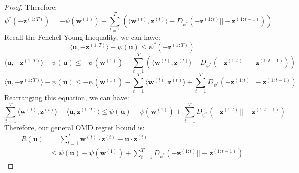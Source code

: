 \documentclass[11pt]{article}
\begin{document}
\begin{proof}
Therefore:
\begin{equation*}
    \psi^*(-\bm{z}^{(1:T)}) = -\psi(\bm{w}^{(1)}) - \sum_{t=1}^T \left( \langle \bm{w}^{(t)}, \bm{z}^{(t)} \rangle -  D_{\psi^*}(-\bm{z}^{(1:t)}||-\bm{z}^{(1:t-1)})\right)
\end{equation*}
Recall the Fenchel-Young Inequality, we can have:
\begin{equation*}
     \langle \bm{u}, -\bm{z}^{(1:T)} \rangle - \psi(\bm{u}) \leq \psi^*(-\bm{z}^{(1:T)})
\end{equation*}
\begin{equation*}
     \langle \bm{u}, -\bm{z}^{(1:T)} \rangle - \psi(\bm{u}) \leq -\psi(\bm{w}^{(1)}) - \sum_{t=1}^T \left( \langle \bm{w}^{(t)}, \bm{z}^{(t)} \rangle -  D_{\psi^*}(-\bm{z}^{(1:t)}||-\bm{z}^{(1:t-1)})\right)
\end{equation*}
\begin{equation*}
     \langle \bm{u}, -\bm{z}^{(1:T)} \rangle - \psi(\bm{u}) \leq -\psi(\bm{w}^{(1)}) - \sum_{t=1}^T  \langle \bm{w}^{(t)}, \bm{z}^{(t)} \rangle + \sum_{t=1}^T D_{\psi^*}(-\bm{z}^{(1:t)}||-\bm{z}^{(1:t-1)})
\end{equation*}
Rearranging this equation, we can have:
\begin{equation*}
     \sum_{t=1}^T  \langle \bm{w}^{(t)}, \bm{z}^{(t)} \rangle - \langle \bm{u}, \bm{z}^{(1:T)} \rangle  \leq \psi(\bm{u}) -\psi(\bm{w}^{(1)}) + \sum_{t=1}^T D_{\psi^*}(-\bm{z}^{(1:t)}||-\bm{z}^{(1:t-1)})
\end{equation*}
Therefore, our general OMD regret bound is:
\begin{equation*}
\begin{aligned}
    R(\bm{u})  &= \sum_{t=1}^{T} \bm{w}^{(t)} \cdot \bm{z}^{(t)} - \bm{u} \cdot \bm{z}^{(t)}\\
    &\leq \psi(\bm{u}) -\psi(\bm{w}^{(1)}) + \sum_{t=1}^T D_{\psi^*}(-\bm{z}^{(1:t)}||-\bm{z}^{(1:t-1)})
\end{aligned}
\end{equation*}

\end{proof}

\newpage
{


}
\end{document}
